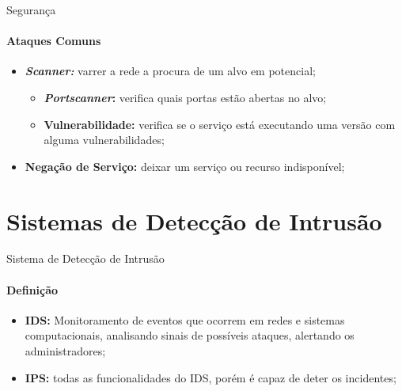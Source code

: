 \documentclass[aspectratio=169]{beamer}
\begin{document}
\begin{frame}{Segurança}
    \framesubtitle{Ataques Comuns}
    \begin{itemize}
        \item \textbf{\textit{Scanner:}} varrer a rede a procura de um alvo em potencial; 
            \begin{itemize}
                \item \textbf{\textit{Portscanner}:} verifica quais portas estão abertas no alvo;
                \item \textbf{Vulnerabilidade:} verifica se o serviço está executando uma versão com alguma vulnerabilidades;
            \end{itemize}
        \item \textbf{Negação de Serviço:} deixar um serviço ou recurso indisponível;
    \end{itemize}
\end{frame}
\section{Sistemas de Detecção de Intrusão}
\begin{frame}{Sistema de Detecção de Intrusão}
    \framesubtitle{Definição}
    \begin{itemize}
        \item \textbf{IDS:} Monitoramento de eventos que ocorrem em redes e sistemas computacionais, analisando sinais de possíveis ataques, alertando os administradores;
        \item \textbf{IPS:} todas as funcionalidades do IDS, porém é capaz de deter os incidentes;
    \end{itemize}
\end{frame}
\end{document}
